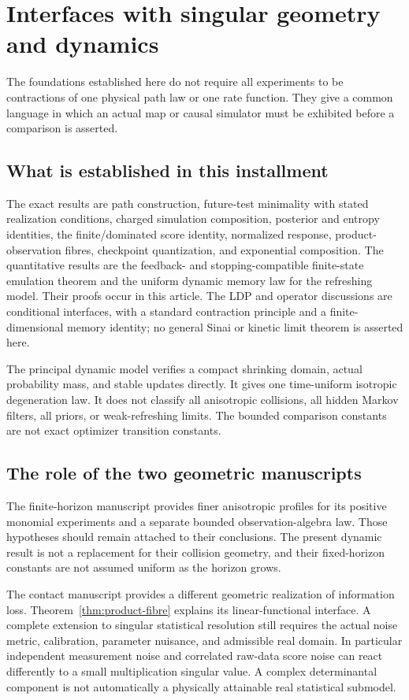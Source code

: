 \section{Interfaces with singular geometry and dynamics}\label{sec:interfaces}
The foundations established here do not require all experiments to be
contractions of one physical path law or one rate function. They give a
common language in which an actual map or causal simulator must be exhibited
before a comparison is asserted.

\subsection{What is established in this installment}
The exact results are path construction, future-test minimality with stated
realization conditions, charged simulation composition, posterior and
entropy identities, the finite/dominated score identity, normalized
response, product-observation fibres, checkpoint quantization, and
exponential composition. The quantitative results are the feedback- and
stopping-compatible finite-state emulation theorem and the uniform dynamic
memory law for the refreshing model. Their proofs occur in this article.
The LDP and operator discussions are conditional interfaces, with a standard
contraction principle and a finite-dimensional memory identity; no general
Sinai or kinetic limit theorem is asserted here.

The principal dynamic model verifies a compact shrinking domain, actual
probability mass, and stable updates directly. It gives one time-uniform
isotropic degeneration law. It does not classify all anisotropic
collisions, all hidden Markov filters, all priors, or weak-refreshing limits.
The bounded comparison constants are not exact optimizer transition
constants.

\subsection{The role of the two geometric manuscripts}
The finite-horizon manuscript \cite{QiA1} provides finer anisotropic
profiles for its positive monomial experiments and a separate bounded
observation-algebra law. Those hypotheses should remain attached to their
conclusions. The present dynamic result is not a replacement for their
collision geometry, and their fixed-horizon constants are not assumed
uniform as the horizon grows.

The contact manuscript \cite{QiA2} provides a different geometric
realization of information loss. Theorem~\ref{thm:product-fibre} explains
its linear-functional interface. A complete extension to singular
statistical resolution still requires the actual noise metric, calibration,
parameter nuisance, and admissible real domain. In particular independent
measurement noise and correlated raw-data score noise can react differently
to a small multiplication singular value. A complex determinantal component
is not automatically a physically attainable real statistical submodel.

